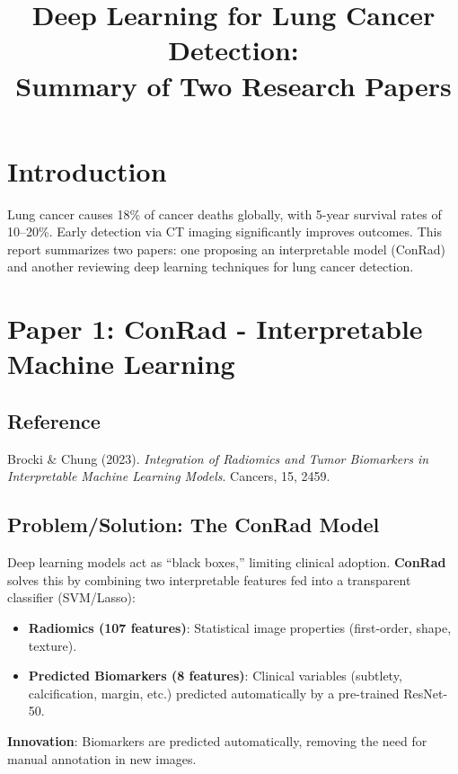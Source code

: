 \documentclass[10pt,a4paper]{article}
\title{\textbf{Deep Learning for Lung Cancer Detection:\\ Summary of Two Research Papers}}
\author{}
\date{}
\begin{document}
\maketitle
\vspace{-0.5cm}

\section{Introduction}

Lung cancer causes 18\% of cancer deaths globally, with 5-year survival rates of 10--20\%. Early detection via CT imaging significantly improves outcomes. This report summarizes two papers: one proposing an interpretable model (ConRad) and another reviewing deep learning techniques for lung cancer detection.

\section{Paper 1: ConRad - Interpretable Machine Learning}

\subsection{Reference}
Brocki \& Chung (2023). \textit{Integration of Radiomics and Tumor Biomarkers in Interpretable Machine Learning Models}. Cancers, 15, 2459.
\vspace{-0.2cm}

\subsection{Problem/Solution: The ConRad Model}
Deep learning models act as ``black boxes,'' limiting clinical adoption. \textbf{ConRad} solves this by combining two interpretable features fed into a transparent classifier (SVM/Lasso):
\begin{itemize}[noitemsep, topsep=0pt, parsep=0pt, leftmargin=1em]
    \item \textbf{Radiomics (107 features)}: Statistical image properties (first-order, shape, texture).
    \item \textbf{Predicted Biomarkers (8 features)}: Clinical variables (subtlety, calcification, margin, etc.) predicted automatically by a pre-trained ResNet-50.
\end{itemize}
\textbf{Innovation}: Biomarkers are predicted automatically, removing the need for manual annotation in new images.
\vspace{-0.2cm}
\end{document}
